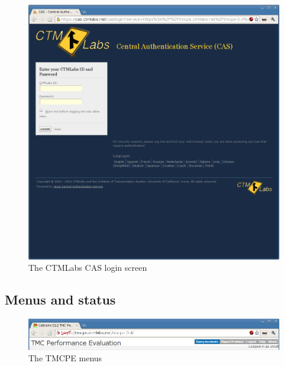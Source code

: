 \documentclass[12pt]{report}
\renewcommand{\fixme}[3][]{#1\xspace}
\newcounter{space}
\begin{document}
\begin{figure}[t]
  \begin{center}
    \includegraphics[width=\textwidth]{images/ctmlabs-login.png}
    \caption{The CTMLabs CAS login screen}
    \label{fig:ctmlabs-login}
  \end{center}
\end{figure}

\fixme{crindt}{Discuss the log in process and the integration with the
  CAS server.  include screenshots}

\subsection{Menus and status}
\label{sec:ui-menu}


\begin{figure}[t]
  \begin{center}
    \includegraphics[width=\textwidth]{images/tmcpe-menu.png}
    \caption{The TMCPE menus}
    \label{fig:tmcpe-menu}
  \end{center}
\end{figure}
\end{document}
